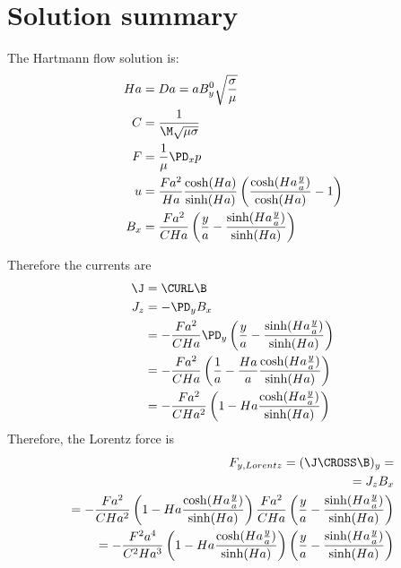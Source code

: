 \documentclass[11pt]{article}
\begin{document}
\doublespacing
\MOONSTITLE
\maketitle

\section{Solution summary}

The Hartmann flow solution is:
\begin{equation}\begin{aligned}
Ha  & = Da = a B_y^0 \sqrt{\frac{\sigma}{\mu}} \\
C   & = \frac{1}{\M \sqrt{\mu \sigma}} \\
F   & = \frac{1}{\mu} \PD_x p \\
u   & = \frac{Fa^2}{Ha} \frac{\cosh(Ha)}{\sinh(Ha)}  \left( \frac{\cosh(Ha \frac{y}{a} )}{\cosh(Ha)}  - 1 \right) \\
B_x & = \frac{Fa^2}{CHa} \left(\frac{y}{a} - \frac{\sinh(Ha \frac{y}{a})}{\sinh(Ha)}\right) \\
\end{aligned} \end{equation}

Therefore the currents are
\begin{equation}\begin{aligned}
\J  & = \CURL \B \\
J_z & = - \PD_y B_x \\
    & = - \frac{Fa^2}{CHa} \PD_y \left(\frac{y}{a} - \frac{\sinh(Ha \frac{y}{a})}{\sinh(Ha)}\right) \\
    & = - \frac{Fa^2}{CHa} \left(\frac{1}{a} - \frac{Ha}{a} \frac{\cosh(Ha \frac{y}{a})}{\sinh(Ha)}\right) \\
    & = - \frac{Fa^2}{CHa^2} \left(1 - Ha \frac{\cosh(Ha \frac{y}{a})}{\sinh(Ha)}\right) \\
\end{aligned} \end{equation}
Therefore, the Lorentz force is
\begin{equation}\begin{aligned}
F_{y,Lorentz} = (\J \CROSS \B)_y =  \\
              = J_z B_x \\
              = - \frac{Fa^2}{CHa^2} \left(1 - Ha \frac{\cosh(Ha \frac{y}{a})}{\sinh(Ha)}\right) \frac{Fa^2}{CHa} \left(\frac{y}{a} - \frac{\sinh(Ha \frac{y}{a})}{\sinh(Ha)}\right) \\
              = - \frac{F^2a^4}{C^2Ha^3} \left(1 - Ha \frac{\cosh(Ha \frac{y}{a})}{\sinh(Ha)}\right) \left(\frac{y}{a} - \frac{\sinh(Ha \frac{y}{a})}{\sinh(Ha)}\right) \\
\end{aligned} \end{equation}
\end{document}
